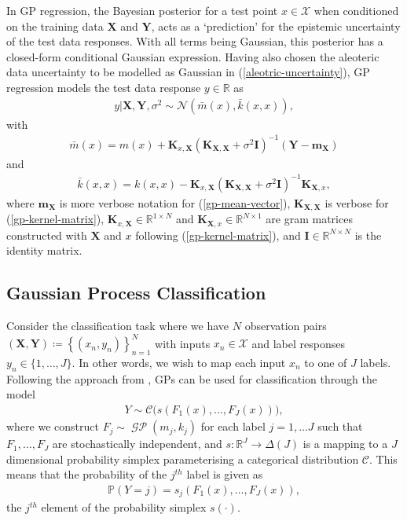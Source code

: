 \documentclass{article}
\newcommand{\GP}{\operatorname{\mathcal{GP}}}
\numberwithin{equation}{section}
\begin{document}
In GP regression, the Bayesian posterior for a test point $x \in \mathcal{X}$ when conditioned on the training data $\mathbf{X}$ and $\mathbf{Y}$, acts as a `prediction' for the epistemic uncertainty of the test data responses. 
With all terms being Gaussian, this posterior has a closed-form conditional Gaussian expression.
Having also chosen the aleoteric data uncertainty to be modelled as Gaussian in (\ref{aleotric-uncertainty}), GP regression models the test data response $y \in \mathbb{R}$ as
\begin{align}
    y \vert \mathbf{X}, \mathbf{Y}, \sigma^2
    \sim \mathcal{N}\left(\bar{m}(x), \bar{k}(x, x)\right),
    \label{gp-posterior-normal}
\end{align}
with
\begin{align}
    \label{gp-posterior-mean}
    \bar{m}(x) = m(x) + \mathbf{K}_{x, \mathbf{X}} \left(\mathbf{K}_{\mathbf{X}, \mathbf{X}} + \sigma^2 \mathbf{I}\right)^{-1} \left( \mathbf{Y} - \mathbf{m}_{\mathbf{X}}\right)
\end{align}
and
\begin{align}
    \label{gp-posterior-covariance}
    \bar{k}(x, x) = k(x, x) - \mathbf{K}_{x, \mathbf{X}} \left(\mathbf{K}_{\mathbf{X}, \mathbf{X}} + \sigma^2 \mathbf{I}\right)^{-1} \mathbf{K}_{\mathbf{X}, x},
\end{align}
where $\mathbf{m}_{\mathbf{X}}$ is more verbose notation for (\ref{gp-mean-vector}), $\mathbf{K}_{\mathbf{X}, \mathbf{X}}$ is verbose for (\ref{gp-kernel-matrix}), $\mathbf{K}_{x, \mathbf{X}} \in \mathbb{R}^{1 \times N}$ and $\mathbf{K}_{\mathbf{X}, x} \in \mathbb{R}^{N \times 1}$ are gram matrices constructed with $\mathbf{X}$ and $x$ following (\ref{gp-kernel-matrix}), and $\mathbf{I} \in \mathbb{R}^{N \times N}$ is the identity matrix.

\subsection{Gaussian Process Classification}
Consider the classification task where we have $N$ observation pairs $(\mathbf{X}, \mathbf{Y}) \coloneqq \left\{(x_n, y_n)\right\}_{n=1}^{N}$ with inputs $x_n \in \mathcal{X}$ and label responses $y_n \in \{1, \dots, J\}$. In other words, we wish to map each input $x_n$ to one of $J$ labels. Following the approach from \cite{matthews2017scalable}, GPs can be used for classification through the model
\begin{align}
    Y \sim \mathcal{C}\Big(s\left(F_1(x), \dots, F_J(x)\right)\Big),
    \label{gp-classifier}
\end{align}
where we construct $F_j \sim \GP\left(m_j, k_j\right)$ for each label $j=1, \dots J$ such that $F_1, \dots, F_J$ are stochastically independent, and $s: \mathbb{R}^J \rightarrow \Delta(J)$ is a mapping to a $J$ dimensional probability simplex parameterising a categorical distribution $\mathcal{C}$. 
This means that the probability of the $j^{th}$ label is given as
\begin{align}
    \mathbb{P}(Y=j) = s_j(F_1(x), \dots, F_J(x)),
\end{align}
the $j^{th}$ element of the probability simplex $s(\cdot)$.
\end{document}
